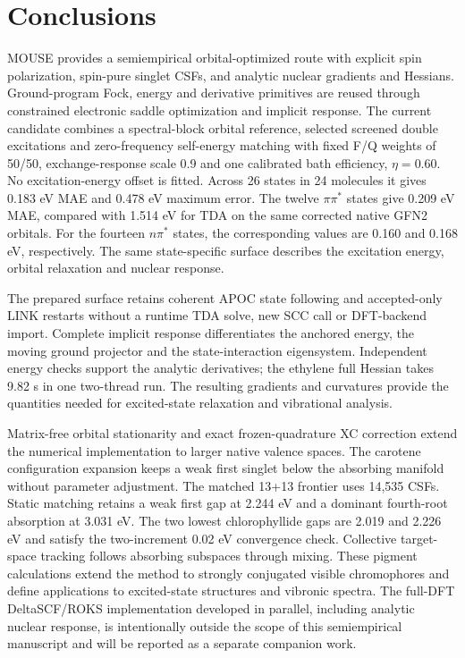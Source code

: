 \documentclass[11pt,a4paper]{article}
\begin{document}
\section{Conclusions}
MOUSE provides a semiempirical orbital-optimized route with explicit spin
polarization, spin-pure singlet CSFs, and analytic nuclear gradients and
Hessians. Ground-program Fock, energy and derivative primitives are reused
through constrained electronic saddle optimization and implicit response.
The current candidate combines a spectral-block orbital reference,
selected screened double excitations and zero-frequency self-energy
matching with fixed F/Q weights of 50/50,
exchange-response scale 0.9 and one calibrated bath efficiency,
$\eta=0.60$. No excitation-energy offset is fitted. Across 26 states in 24
molecules it gives 0.183 eV MAE and 0.478 eV
maximum error. The twelve $\pi\pi^*$ states give 0.209 eV MAE, compared
with 1.514 eV for TDA on the same corrected native GFN2 orbitals. For the
fourteen $n\pi^*$ states, the corresponding values are 0.160 and
0.168 eV, respectively. The same state-specific surface describes the
excitation energy, orbital relaxation and nuclear response.

The prepared surface retains coherent APOC state following and accepted-only
LINK restarts without a runtime TDA solve, new SCC call or DFT-backend
import. Complete implicit response differentiates the anchored energy,
the moving ground projector and the state-interaction eigensystem.
Independent energy checks support the analytic derivatives; the ethylene full
Hessian takes 9.82 s in one two-thread run. The resulting gradients and
curvatures provide the quantities needed for excited-state relaxation and
vibrational analysis.

Matrix-free orbital stationarity and exact frozen-quadrature XC correction
extend the numerical implementation to larger native valence spaces. The
carotene configuration expansion keeps a weak first singlet below the
absorbing manifold without parameter adjustment. The matched 13+13
frontier uses 14,535 CSFs. Static matching retains a weak first gap at
2.244 eV and a dominant fourth-root absorption at 3.031 eV. The two lowest
chlorophyllide gaps are 2.019 and 2.226 eV and satisfy the two-increment
0.02 eV convergence check.
Collective target-space tracking follows absorbing subspaces through
mixing. These pigment calculations extend the method to strongly conjugated
visible chromophores and define applications to excited-state structures and
vibronic spectra.
The full-DFT DeltaSCF/ROKS implementation developed in parallel, including
analytic nuclear response, is intentionally outside the scope of this
semiempirical manuscript and will be reported as a separate companion work.
\end{document}
